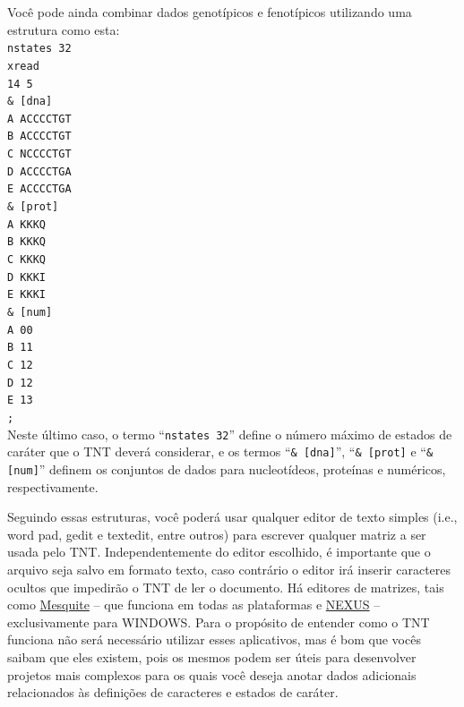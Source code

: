 \begin{refsection}
Você pode ainda combinar dados genotípicos e fenotípicos utilizando uma estrutura como esta:
\\
\indent\indent\texttt{nstates 32}\\
\indent\indent\texttt{xread}\\
\indent\indent\texttt{14 5}\\
\indent\indent\texttt{\& [dna]}\\
\indent\indent\texttt{A ACCCCTGT}\\
\indent\indent\texttt{B ACCCCTGT}\\
\indent\indent\texttt{C NCCCCTGT}\\
\indent\indent\texttt{D ACCCCTGA}\\
\indent\indent\texttt{E ACCCCTGA}\\
\indent\indent\texttt{\& [prot]}\\
\indent\indent\texttt{A  KKKQ}\\
\indent\indent\texttt{B  KKKQ}\\
\indent\indent\texttt{C  KKKQ}\\
\indent\indent\texttt{D  KKKI}\\
\indent\indent\texttt{E  KKKI}\\
\indent\indent\texttt{\& [num]}\\
\indent\indent\texttt{A  00}\\
\indent\indent\texttt{B  11}\\
\indent\indent\texttt{C  12}\\
\indent\indent\texttt{D  12}\\
\indent\indent\texttt{E  13}\\
\indent\indent\texttt{;}\\

Neste último caso, o termo ``\texttt{nstates 32}'' define o número máximo de estados de caráter que o TNT deverá considerar, e os termos  ``\texttt{\& [dna]}'',  ``\texttt{\& [prot]} e  ``\texttt{\& [num]}'' definem os conjuntos de dados para nucleotídeos, proteínas e numéricos, respectivamente.

Seguindo essas estruturas, você poderá usar qualquer editor de texto simples (i.e., word pad, gedit e textedit, entre outros) para escrever qualquer matriz a ser usada pelo TNT. Independentemente do editor escolhido, é importante que o arquivo seja salvo em formato texto, caso contrário o editor irá inserir caracteres ocultos que impedirão o TNT de ler o documento. Há editores de matrizes, tais como \href{http://www.mesquiteproject.org/}{Mesquite} -- que funciona em todas as plataformas e \href{http://en.bio-soft.net/tree/NDE.html}{NEXUS} -- exclusivamente para WINDOWS. Para o propósito de entender como o TNT funciona não será necessário utilizar esses aplicativos, mas é bom que vocês saibam que eles existem, pois os mesmos podem ser úteis para desenvolver projetos mais complexos para os quais você deseja anotar dados adicionais relacionados às definições de caracteres e estados de caráter.\\



\end{refsection}
